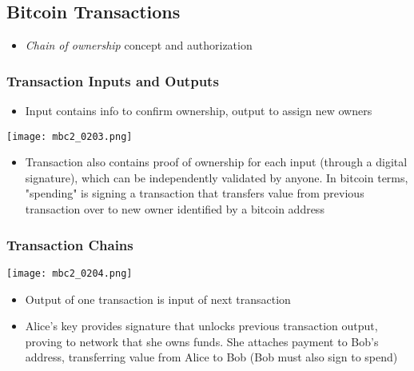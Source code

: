 \documentclass[english, 11pt]{article}
\begin{document}
\subsection{Bitcoin Transactions}
\begin{itemize}
    \item \textit{Chain of ownership} concept and authorization
\end{itemize}

\subsubsection{Transaction Inputs and Outputs}
\begin{itemize}
    \item Input contains info to confirm ownership, output to assign new owners 
\end{itemize}

\begin{tcolorbox}
\begin{minipage}{0.45\linewidth}
    \texttt{[image: mbc2\_0203.png]}
\end{minipage}\hfil
\begin{minipage}{0.5\linewidth}
\begin{itemize}
    \item Transaction also contains proof of ownership for each input (through a digital signature), which can be independently validated by anyone. In bitcoin terms, "spending" is signing a transaction that transfers value from previous transaction over to new owner identified by a bitcoin address
\end{itemize}
\end{minipage}
\end{tcolorbox}

\subsubsection{Transaction Chains}
\begin{tcolorbox}
\begin{minipage}{0.45\linewidth}
    \texttt{[image: mbc2\_0204.png]}
\end{minipage}\hfil
\begin{minipage}{0.5\linewidth}
\begin{itemize}
    \item Output of one transaction is input of next transaction
    \item Alice's key provides signature that unlocks previous transaction output, proving to network that she owns funds. She attaches payment to Bob's address, transferring value from Alice to Bob (Bob must also sign to spend)
\end{itemize}
\end{minipage}
\end{tcolorbox}
\end{document}
